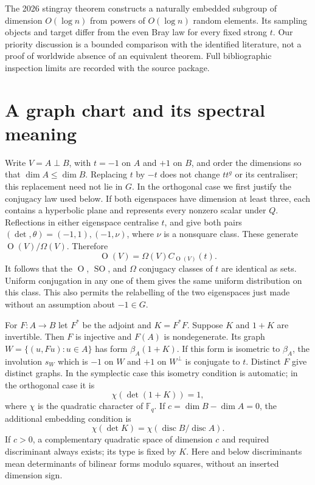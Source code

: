 \documentclass[11pt]{article}
\newcommand{\F}{\mathbb F}
\newcommand{\Or}{\operatorname O}
\newcommand{\SO}{\operatorname{SO}}
\newcommand{\Om}{\Omega}
\newcommand{\disc}{\operatorname{disc}}
\begin{document}
The 2026 stingray theorem \cite[Theorems~1.1,1.3]{stingray} constructs a naturally embedded subgroup of dimension $O(\log n)$ from powers of $O(\log n)$ random elements. Its sampling objects and target differ from the even Bray law for every fixed strong $t$. Our priority discussion is a bounded comparison with the identified literature, not a proof of worldwide absence of an equivalent theorem. Full bibliographic inspection limits are recorded with the source package.

\section{A graph chart and its spectral meaning}\label{chartsec}
Write $V=A\perp B$, with $t=-1$ on $A$ and $+1$ on $B$, and order the dimensions so that $\dim A\le\dim B$. Replacing $t$ by $-t$ does not change $tt^g$ or its centraliser; this replacement need not lie in $G$. In the orthogonal case we first justify the conjugacy law used below. If both eigenspaces have dimension at least three, each contains a hyperbolic plane and represents every nonzero scalar under $Q$. Reflections in either eigenspace centralise $t$, and give both pairs $(\det,\theta)=(-1,1),(-1,\nu)$, where $\nu$ is a nonsquare class. These generate $\Or(V)/\Om(V)$. Therefore
\[
\Or(V)=\Om(V)C_{\Or(V)}(t).
\]
It follows that the $\Or$, $\SO$, and $\Om$ conjugacy classes of $t$ are identical as sets. Uniform conjugation in any one of them gives the same uniform distribution on this class. This also permits the relabelling of the two eigenspaces just made without an assumption about $-1\in G$.

For $F:A\longrightarrow B$ let $F^*$ be the adjoint and $K=F^*F$. Suppose $K$ and $1+K$ are invertible. Then $F$ is injective and $F(A)$ is nondegenerate. Its graph $W=\{(u,Fu):u\in A\}$ has form $\beta_A(1+K)$. If this form is isometric to $\beta_A$, the involution $s_W$ which is $-1$ on $W$ and $+1$ on $W^\perp$ is conjugate to $t$. Distinct $F$ give distinct graphs. In the symplectic case this isometry condition is automatic; in the orthogonal case it is
\begin{equation}\label{graphscond}
\chi(\det(1+K))=1,
\end{equation}
where $\chi$ is the quadratic character of $\F_q$. If $c=\dim B-\dim A=0$, the additional embedding condition is
\begin{equation}\label{codim0}
\chi(\det K)=\chi(\disc B/\disc A).
\end{equation}
If $c>0$, a complementary quadratic space of dimension $c$ and required discriminant always exists; its type is fixed by $K$. Here and below discriminants mean determinants of bilinear forms modulo squares, without an inserted dimension sign.
\end{document}
